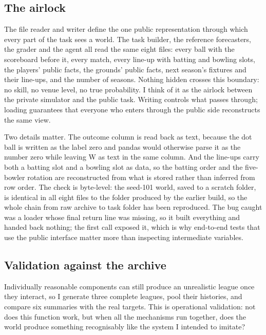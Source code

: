\documentclass[11pt,letterpaper]{article}
\begin{document}
\subsection{The airlock}

The file reader and writer define the one public representation through which every part of the task sees a world. The task builder, the reference forecasters, the grader and the agent all read the same eight files: every ball with the scoreboard before it, every match, every line-up with batting and bowling slots, the players' public facts, the grounds' public facts, next season's fixtures and their line-ups, and the number of seasons. Nothing hidden crosses this boundary: no skill, no venue level, no true probability. I think of it as the airlock between the private simulator and the public task. Writing controls what passes through; loading guarantees that everyone who enters through the public side reconstructs the same view.


Two details matter. The outcome column is read back as text, because the dot ball is written as the label zero and pandas would otherwise parse it as the number zero while leaving W as text in the same column. And the line-ups carry both a batting slot and a bowling slot as data, so the batting order and the five-bowler rotation are reconstructed from what is stored rather than inferred from row order. The check is byte-level: the seed-101 world, saved to a scratch folder, is identical in all eight files to the folder produced by the earlier build, so the whole chain from raw archive to task folder has been reproduced. The bug caught was a loader whose final return line was missing, so it built everything and handed back nothing; the first call exposed it, which is why end-to-end tests that use the public interface matter more than inspecting intermediate variables.


\subsection{Validation against the archive}

Individually reasonable components can still produce an unrealistic league once they interact, so I generate three complete leagues, pool their histories, and compare six summaries with the real targets. This is operational validation: not does this function work, but when all the mechanisms run together, does the world produce something recognisably like the system I intended to imitate?
\end{document}
